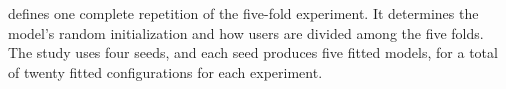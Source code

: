 defines one complete repetition of the five-fold experiment. It determines the model's
random initialization and how users are divided among the five folds. The study uses
four seeds, and each seed produces five fitted models, for a total of twenty fitted configurations for each
experiment.

